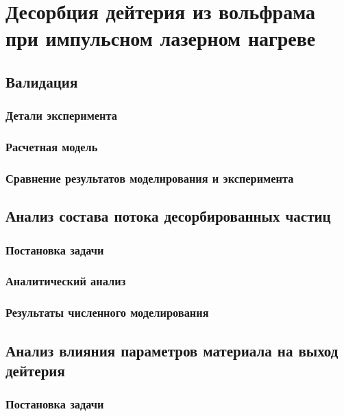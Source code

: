 \chapter{Десорбция дейтерия из вольфрама при импульсном лазерном нагреве}\label{ch:ch4}

\section{Валидация}\label{sec:ch4/sec1}
\subsection{Детали эксперимента}\label{subsec:ch4/sec1/subsec1}
\subsection{Расчетная модель}\label{subsec:ch4/sec1/subsec2}
\subsection{Сравнение результатов моделирования и эксперимента}\label{subsec:ch4/sec1/subsec3}

\section{Анализ состава потока десорбированных частиц}\label{sec:ch4/sec2}
\subsection{Постановка задачи}\label{subsec:ch4/seс2/subsec1}
\subsection{Аналитический анализ}\label{subsec:ch4/seс2/subsec2}
\subsection{Результаты численного моделирования}\label{subsec:ch4/seс2/subsec3}

\section{Анализ влияния параметров материала на выход дейтерия}\label{sec:ch4/seс3}
\subsection{Постановка задачи}\label{subsec:ch4/seс3/subsec1}
